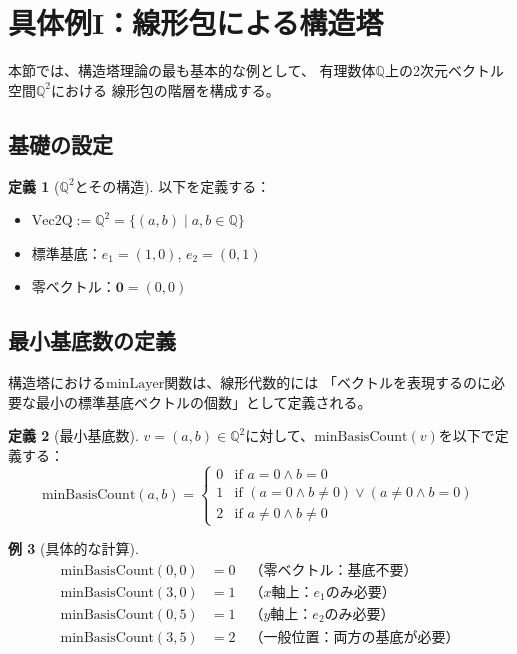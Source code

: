 \documentclass[a4paper,12pt]{ltjsarticle}
\theoremstyle{definition}
\newtheorem{definition}{定義}[section]
\newtheorem{example}[definition]{例}
\begin{document}
\section{具体例I：線形包による構造塔}

本節では、構造塔理論の最も基本的な例として、
有理数体$\mathbb{Q}$上の2次元ベクトル空間$\mathbb{Q}^2$における
線形包の階層を構成する。

\subsection{基礎の設定}

\begin{definition}[$\mathbb{Q}^2$とその構造]
以下を定義する：
\begin{itemize}
\item $\mathrm{Vec2Q} := \mathbb{Q}^2 = \{(a, b) \mid a, b \in \mathbb{Q}\}$
\item 標準基底：$e_1 = (1, 0)$, $e_2 = (0, 1)$
\item 零ベクトル：$\mathbf{0} = (0, 0)$
\end{itemize}
\end{definition}

\subsection{最小基底数の定義}

構造塔における$\mathrm{minLayer}$関数は、線形代数的には
「ベクトルを表現するのに必要な最小の標準基底ベクトルの個数」として定義される。

\begin{definition}[最小基底数]\label{def:minBasisCount}
$v = (a, b) \in \mathbb{Q}^2$に対して、$\mathrm{minBasisCount}(v)$を以下で定義する：
\[
\mathrm{minBasisCount}(a, b) = \begin{cases}
0 & \text{if } a = 0 \land b = 0 \\
1 & \text{if } (a = 0 \land b \neq 0) \lor (a \neq 0 \land b = 0) \\
2 & \text{if } a \neq 0 \land b \neq 0
\end{cases}
\]
\end{definition}

\begin{example}[具体的な計算]
\begin{align*}
\mathrm{minBasisCount}(0, 0) &= 0 \quad \text{（零ベクトル：基底不要）} \\
\mathrm{minBasisCount}(3, 0) &= 1 \quad \text{（$x$軸上：$e_1$のみ必要）} \\
\mathrm{minBasisCount}(0, 5) &= 1 \quad \text{（$y$軸上：$e_2$のみ必要）} \\
\mathrm{minBasisCount}(3, 5) &= 2 \quad \text{（一般位置：両方の基底が必要）}
\end{align*}
\end{example}
\end{document}
